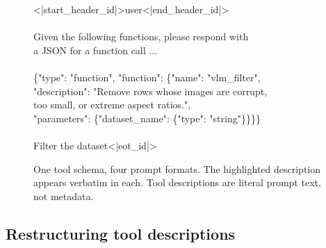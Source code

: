 \begin{figure}[H]
\begin{minipage}{0.8\linewidth}
\vspace{-4pt}

\begin{tcolorbox}[enhanced, colback=llamabg, colframe=llamaframe, boxrule=0.8pt, left=4pt, right=4pt, top=4pt, bottom=3pt, sharp corners,
  attach boxed title to top left={xshift=4pt, yshift=-2pt},
  boxed title style={empty, size=minimal},
  coltitle=llamaframe, fonttitle=\sffamily\bfseries\large,
  title={Llama 3.1}]
\ttfamily\scriptsize
<|start\_header\_id|>user<|end\_header\_id|>\\
\\
Given the following functions, please respond with\\
a JSON for a function call ...\\
\\
\{"type": "function", "function": \{"name": "vlm\_filter",\\
"description": \colorbox{yellow!30}{"Remove rows whose images are corrupt,}\\
\colorbox{yellow!30}{too small, or extreme aspect ratios."},\\
"parameters": \{"dataset\_name": \{"type": "string"\}\}\}\}\\
\\
Filter the dataset<|eot\_id|>
\end{tcolorbox}

\end{minipage}
\caption{One tool schema, four prompt formats. The highlighted description appears verbatim in each. Tool descriptions are literal prompt text, not metadata.}
\label{fig:tool-formats}
\end{figure}

\subsection{Restructuring tool descriptions}


